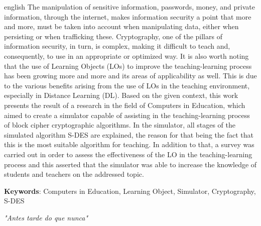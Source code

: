 \documentclass[
	12pt,				%
	openany,			%
	oneside,			%
	a4paper,			%
	english,			%
	brazil				%
	]{{Modelo/abntex2_FBUNI}}
\begin{document}
\begin{resumo}[Abstract]
    \begin{otherlanguage*}{english}
    The manipulation of sensitive information, passwords, money, and private information, through the internet, makes information security a point that more and more, must be taken into account when manipulating data, either when persisting or when trafficking these. Cryptography, one of the pillars of information security, in turn, is complex, making it difficult to teach and, consequently, to use in an appropriate or optimized way. It is also worth noting that the use of Learning Objects (LOs) to improve the teaching-learning process has been growing more and more and its areas of applicability as well. This is due to the various benefits arising from the use of LOs in the teaching environment, especially in Distance Learning (DL). Based on the given context, this work presents the result of a research in the field of Computers in Education, which aimed to create a simulator capable of assisting in the teaching-learning process of block cipher cryptographic algorithms. In the simulator, all stages of the simulated algorithm S-DES are explained, the reason for that being the fact that this is the most suitable algorithm for teaching. In addition to that, a survey was carried out in order to assess the effectiveness of the LO in the teaching-learning process and this asserted that the simulator was able to increase the knowledge of students and teachers on the addressed topic.
    
    \vspace{\onelineskip}
    \noindent 
    \textbf{Keywords}: Computers in Education, Learning Object, Simulator, Cryptography, S-DES
    \end{otherlanguage*}
\end{resumo}

\begin{epigrafe}
    \vspace*{\fill}
	\begin{flushright}
		\textit{
		    "Antes tarde do que nunca"
		}
	\end{flushright}
\end{epigrafe}

\printglossary [type=\acronymtype, title=Lista de Siglas e Abreviações, toctitle=Lista de Siglas e Abreviações]
\cleardoublepage

\listoffigures*
\cleardoublepage
\end{document}
